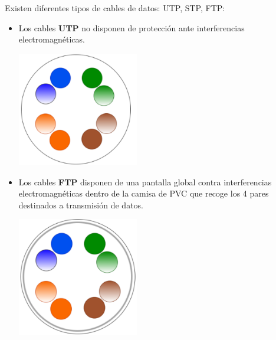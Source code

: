 Existen diferentes tipos de cables de datos: UTP, STP, FTP:
\begin{itemize}
\item Los cables \textbf{UTP} no disponen de protección ante interferencias electromagnéticas.
  \begin{center}
  \includegraphics[width=200]{img/UTP.pdf}
  \end{center}

\item Los cables \textbf{FTP} disponen de una pantalla global contra interferencias electromagnéticas dentro de la camisa de PVC que recoge los 4 pares destinados a transmisión de datos.
  \begin{center}
  \includegraphics[width=200]{img/FTP.pdf}
  \end{center}


\end{itemize}
